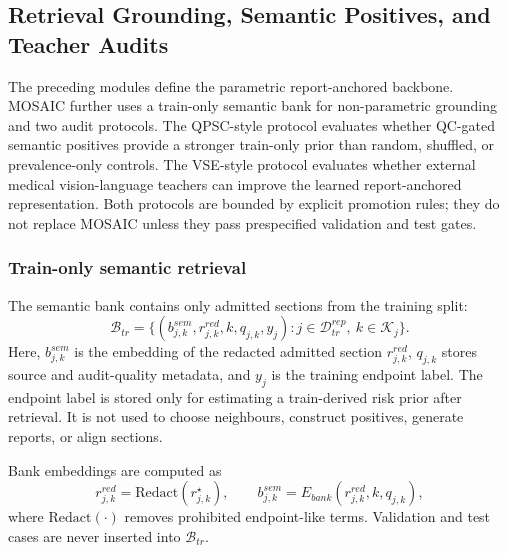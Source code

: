 \subsection{Retrieval Grounding, Semantic Positives, and Teacher Audits}
\label{subsec:retrieval_qpsc_vse_final_topcs}

The preceding modules define the parametric report-anchored backbone. MOSAIC further uses a train-only semantic bank for non-parametric grounding and two audit protocols. The QPSC-style protocol evaluates whether QC-gated semantic positives provide a stronger train-only prior than random, shuffled, or prevalence-only controls. The VSE-style protocol evaluates whether external medical vision-language teachers can improve the learned report-anchored representation. Both protocols are bounded by explicit promotion rules; they do not replace MOSAIC unless they pass prespecified validation and test gates.

\subsubsection{Train-only semantic retrieval}
\label{subsubsec:retrieval_grounding_final_topcs}

The semantic bank contains only admitted sections from the training split:
\begin{equation}
\mathcal{B}_{tr}
=
\{(b_{j,k}^{sem},r_{j,k}^{red},k,q_{j,k},y_j):
j\in\mathcal{D}_{tr}^{rep},\ k\in\mathcal{K}_j\}.
\label{eq:mosaic_semantic_bank_final_topcs}
\end{equation}
Here, $b_{j,k}^{sem}$ is the embedding of the redacted admitted section $r_{j,k}^{red}$, $q_{j,k}$ stores source and audit-quality metadata, and $y_j$ is the training endpoint label. The endpoint label is stored only for estimating a train-derived risk prior after retrieval. It is not used to choose neighbours, construct positives, generate reports, or align sections.

Bank embeddings are computed as
\begin{equation}
r_{j,k}^{red}=\mathrm{Redact}(r_{j,k}^{\star}),
\qquad
b_{j,k}^{sem}=E_{bank}(r_{j,k}^{red},k,q_{j,k}),
\label{eq:mosaic_bank_embedding_final_topcs}
\end{equation}
where $\mathrm{Redact}(\cdot)$ removes prohibited endpoint-like terms. Validation and test cases are never inserted into $\mathcal{B}_{tr}$.

